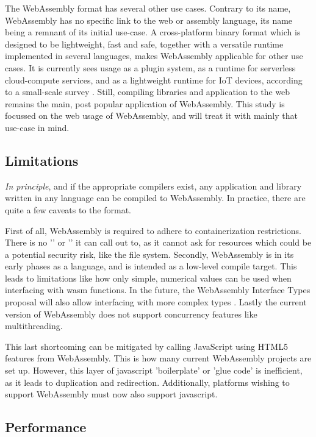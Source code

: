 The WebAssembly format has several other use cases.
Contrary to its name, WebAssembly has no specific link to the web or assembly language, its name being a remnant of its initial use-case.
A cross-platform binary format which is designed to be lightweight, fast and safe, together with a versatile runtime implemented in several languages, makes WebAssembly applicable for other use cases. 
It is currently sees usage as a plugin system, as a runtime for serverless cloud-compute services, and as a lightweight runtime for IoT devices, according to a small-scale survey \citep{eberhardt_state_2022}. 
Still, compiling libraries and application to the web remains the main, post popular application of WebAssembly. 
This study is focussed on the web usage of WebAssembly, and will treat it with mainly that use-case in mind.

\subsection*{Limitations}

\emph{In principle}, and if the appropriate compilers exist, any application and library written in any language can be compiled to WebAssembly. 
In practice, there are quite a few caveats to the format. 

First of all, WebAssembly is required to adhere to containerization restrictions.
There is no '' or '' it can call out to, as it cannot ask for resources which could be a potential security risk, like the file system.
Secondly, WebAssembly is in its early phases as a language, and is intended as a low-level compile target. 
This leads to limitations like how only simple, numerical values can be used when interfacing with \ac{wasm} functions.
In the future, the WebAssembly Interface Types proposal will also allow interfacing with more complex types \citep*{wagner_interface_2022}.
Lastly the current version of WebAssembly does not support concurrency features like multithreading.

This last shortcoming can be mitigated by calling JavaScript using HTML5 features from WebAssembly. 
This is how many current WebAssembly projects are set up. 
However, this layer of javascript 'boilerplate' or 'glue code' is inefficient, as it leads to duplication and redirection.
Additionally, platforms wishing to support WebAssembly must now also support javascript. 


\subsection*{Performance}

